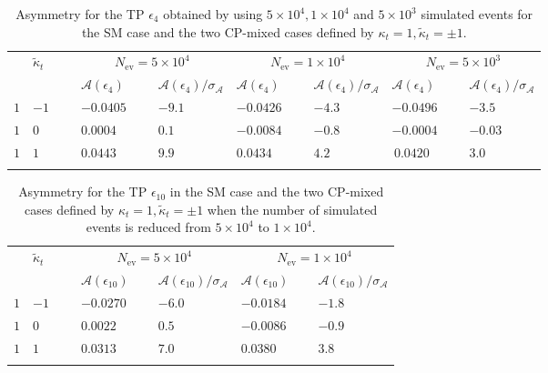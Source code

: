 \documentclass[aps,preprint,tightenlines,floatfix,superscriptaddress,nofootinbib,showpacs]{revtex4-1}
\def\kp{\kappa_t}
\def\kpt{\tilde{\kappa}_t}
\begin{document}
\begin{table}[H]
\caption{Asymmetry for the TP $\epsilon_4$ obtained by using $5\times
  10^4, 1 \times 10^4$ and $5\times 10^3$ simulated events for the SM
  case and the two $\mathrm{CP}$-mixed cases defined by
  $\kp=1,\kpt=\pm 1$. }
\label{table11}
\begin{center}
\begin{tabular}{|C{1cm}|C{1cm}||C{2cm}|C{2cm}||C{2cm}|C{2cm}||C{2cm}|C{2cm}|}
\hhline{|========|}
 &  &  &  &  \\ 
& & $\mathcal{A}(\epsilon_4)$~~&$\mathcal{A}(\epsilon_4)/\sigma_{\mathcal{A}}$ &  $\mathcal{A}(\epsilon_4)$~~&$\mathcal{A}(\epsilon_4)/\sigma_{\mathcal{A}}$ &  $\mathcal{A}(\epsilon_4)$~~&$\mathcal{A}(\epsilon_4)/\sigma_{\mathcal{A}}$ \\
\hhline{|========|} 
$1$ & $-1$~~~ & $-0.0405$~~~ & $-9.1$~~~ & $-0.0426$~~~ & $-4.3$~~~ & $-0.0496$~~~ & $-3.5$~~~ \\[0.6mm]
\hline
$1$ & $0$ & $0.0004$~ & $0.1$~ & $-0.0084$~~~ & $-0.8$~~~ & $-0.0004$~~~ & $-0.03$~~~ \\[0.6mm]
\hline
$1$ & $1$ & $0.0443$~ & $9.9$~ & $0.0434$~ & $4.2$~ & $\,0.0420$~ & $3.0\,\,$ \\
\hhline{|========|}
\end{tabular}
\end{center} 
\end{table}
\begin{table}[H]
\caption{Asymmetry for the TP $\epsilon_{10}$ in the SM case and the
  two $\mathrm{CP}$-mixed cases defined by $\kp=1,\kpt=\pm 1$ when the
  number of simulated events is reduced from $5\times 10^4$ to $1
  \times 10^4$.}
\label{table12}
\begin{center}
\begin{tabular}{|C{1cm}|C{1cm}||C{2cm}|C{2cm}||C{2cm}|C{2cm}|}
\hhline{|======|}
 &  &  &  \\ 
& & $\mathcal{A}(\epsilon_{10})$~~&$\mathcal{A}(\epsilon_{10})/\sigma_{\mathcal{A}}$ &  $\mathcal{A}(\epsilon_{10})$~~&$\mathcal{A}(\epsilon_{10})/\sigma_{\mathcal{A}}$ \\
\hhline{|======|} 
$1$ & $-1$~~~ & $-0.0270$~~~ & $-6.0$~~~ & $-0.0184$~~~ & $-1.8$~~~  \\[0.6mm]
\hline
$1$ & $0$ & $0.0022$~ & $0.5$~ & $-0.0086$~~~ & $-0.9$~~~  \\[0.6mm]
\hline
$1$ & $1$ & $0.0313$~ & $7.0$~ & $0.0380$~ & $3.8\,$ \\
\hhline{|======|}
\end{tabular}
\end{center} 
\end{table}
\end{document}
